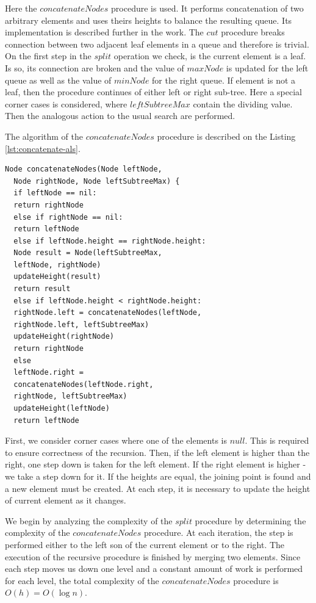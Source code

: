 \documentclass[conference]{IEEEtran}
\theoremstyle{plane}
\begin{document}
		Here the $concatenateNodes$ procedure is used. It performs concatenation of two arbitrary elements and uses theirs heights to balance the resulting queue. Its implementation is described further in the work. The $cut$ procedure breaks connection between two adjacent leaf elements in a queue and therefore is trivial. On the first step in the $split$ operation we check, is the current element is a leaf. Is so, its connection are broken and the value of $maxNode$ is updated for the left queue as well as the value of $minNode$ for the right queue. If element is not a leaf, then the procedure continues of either left or right sub-tree. Here a special corner cases is considered, where $leftSubtreeMax$ contain the dividing value. Then the analogous action to the usual search are performed.
		
		The algorithm of the $concatenateNodes$ procedure is described on the Listing \ref{lst:concatenate-als}.
		
		\begin{lstlisting}[caption={Merging two queues using heights},label={lst:concatenate-als},captionpos=b]
Node concatenateNodes(Node leftNode, 
  Node rightNode, Node leftSubtreeMax) {
  if leftNode == nil:
  return rightNode
  else if rightNode == nil: 
  return leftNode
  else if leftNode.height == rightNode.height:
  Node result = Node(leftSubtreeMax, 
  leftNode, rightNode)
  updateHeight(result)
  return result
  else if leftNode.height < rightNode.height:
  rightNode.left = concatenateNodes(leftNode, 
  rightNode.left, leftSubtreeMax)
  updateHeight(rightNode)
  return rightNode
  else
  leftNode.right = 
  concatenateNodes(leftNode.right, 
  rightNode, leftSubtreeMax)
  updateHeight(leftNode)
  return leftNode
		\end{lstlisting}
		
		First, we consider corner cases where one of the elements is $null$. This is required to ensure correctness of the recursion. Then, if the left element is higher than the right, one step down is taken for the left element. If the right element is higher - we take a step down for it. If the heights are equal, the joining point is found and a new element must be created. At each step, it is necessary to update the height of current element as it changes.
		
		We begin by analyzing the complexity of the $split$ procedure by determining the complexity of the $concatenateNodes$ procedure. At each iteration, the step is performed either to the left son of the current element or to the right. The execution of the recursive procedure is finished by merging two elements. Since each step moves us down one level and a constant amount of work is performed for each level, the total complexity of the $concatenateNodes$ procedure is $O(h)=O(\log n)$.
		
\end{document}
